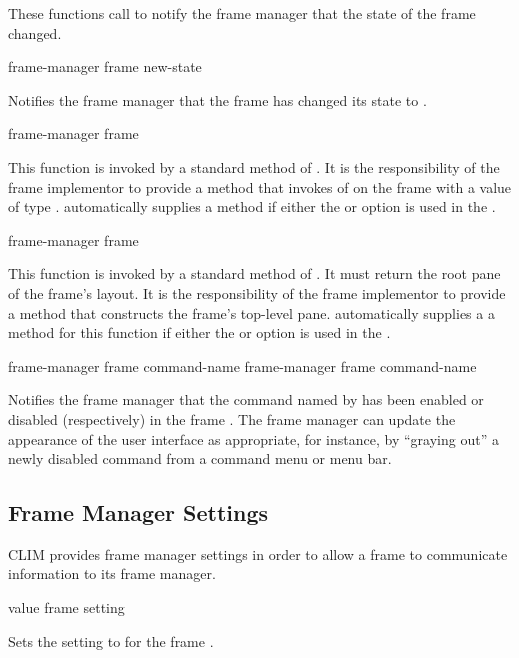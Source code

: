 These functions call  to notify the frame manager
that the state of the frame changed.

 {frame-manager frame new-state}

Notifies the frame manager  that the frame 
has changed its state to .


 {frame-manager frame}

This function is invoked by a standard method of .  It is the
responsibility of the frame implementor to provide a method that invokes
 of  on the frame with a value of type .
 automatically supplies a 
method if either the  or  option is used in the
.

 {frame-manager frame}

This function is invoked by a standard method of .  It must
return the root pane of the frame's layout.  It is the responsibility of the
frame implementor to provide a method that constructs the frame's top-level
pane.   automatically supplies a a method for this
function if either the  or  option is used in the
.


 {frame-manager frame command-name}
 {frame-manager frame command-name}

Notifies the frame manager  that the command named by
 has been enabled or disabled (respectively) in the frame
.  The frame manager can update the appearance of the user interface
as appropriate, for instance, by ``graying out'' a newly disabled command from a
command menu or menu bar.


\subsection {Frame Manager Settings}

CLIM provides frame manager settings in order to allow a frame to communicate
information to its frame manager.

 {value frame setting}

Sets the setting  to  for the frame .

